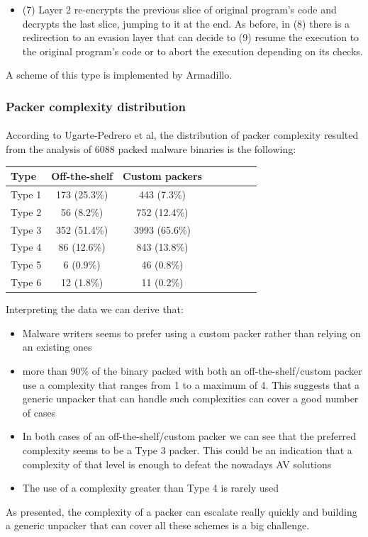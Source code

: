 \begin{itemize}
\item (7) Layer 2 re-encrypts the previous slice of original program's code and decrypts the last slice, jumping to it at the end. As before, in (8) there is a redirection to an evasion layer that can decide to (9) resume the execution to the original program's code or to abort the execution depending on its checks.
\end{itemize}

A scheme of this type is implemented by Armadillo.

\subsubsection{Packer complexity distribution}
\paragraph{}
According to Ugarte-Pedrero et al\cite{sokpacker}, the distribution of packer complexity resulted from the analysis of 6088 packed malware binaries is the following:

\begin{table}[H]
\begin{center}
\begin{tabular}{l*{6}{c}r}
Type      & Off-the-shelf & Custom packers \\
\hline
Type 1 &       173 (25.3\%) & 443 (7.3\%) \\
Type 2 &       56 (8.2\%) & 752 (12.4\%) \\
Type 3 &       352 (51.4\%)  & 3993 (65.6\%) \\
Type 4 &       86 (12.6\%) & 843 (13.8\%) \\
Type 5 &       6 (0.9\%)  & 46 (0.8\%) \\
Type 6 &       12 (1.8\%) & 11 (0.2\%) \\
\end{tabular}
\end{center}
\end{table}

Interpreting the data we can derive that:
\begin{itemize}
\item Malware writers seems to prefer using a custom packer rather than relying on an existing ones
\item more than 90\% of the binary packed with both an off-the-shelf/custom packer use a complexity that ranges from 1 to a maximum of 4. This suggests that a generic unpacker that can handle such complexities can cover a good number of cases
\item In both cases of an off-the-shelf/custom packer we can see that the preferred complexity seems to be a Type 3 packer. This could be an indication that a complexity of that level is enough to defeat the nowadays \ac{AV} solutions
\item The use of a complexity greater than Type 4 is rarely used
\end{itemize}
As presented, the complexity of a packer can escalate really quickly and building a generic unpacker that can cover all these schemes is a big challenge.

